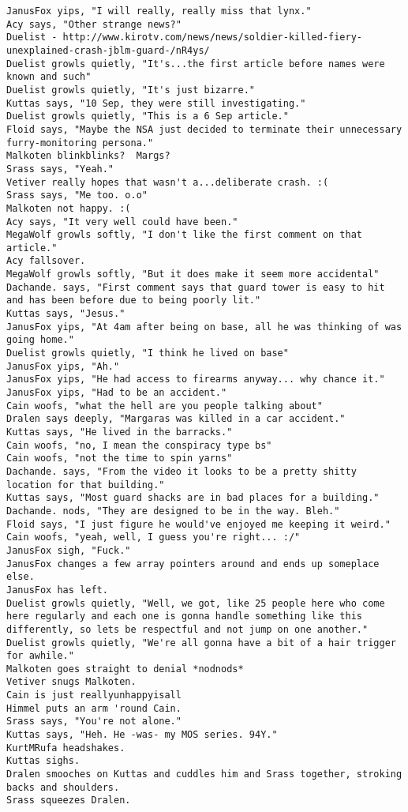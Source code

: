 \begin{verbatim}
JanusFox yips, "I will really, really miss that lynx."
Acy says, "Other strange news?"
Duelist - http://www.kirotv.com/news/news/soldier-killed-fiery-unexplained-crash-jblm-guard-/nR4ys/
Duelist growls quietly, "It's...the first article before names were known and such"
Duelist growls quietly, "It's just bizarre."
Kuttas says, "10 Sep, they were still investigating."
Duelist growls quietly, "This is a 6 Sep article."
Floid says, "Maybe the NSA just decided to terminate their unnecessary furry-monitoring persona."
Malkoten blinkblinks?  Margs?
Srass says, "Yeah."
Vetiver really hopes that wasn't a...deliberate crash. :(
Srass says, "Me too. o.o"
Malkoten not happy. :(
Acy says, "It very well could have been."
MegaWolf growls softly, "I don't like the first comment on that article."
Acy fallsover.
MegaWolf growls softly, "But it does make it seem more accidental"
Dachande. says, "First comment says that guard tower is easy to hit and has been before due to being poorly lit."
Kuttas says, "Jesus."
JanusFox yips, "At 4am after being on base, all he was thinking of was going home."
Duelist growls quietly, "I think he lived on base"
JanusFox yips, "Ah."
JanusFox yips, "He had access to firearms anyway... why chance it."
JanusFox yips, "Had to be an accident."
Cain woofs, "what the hell are you people talking about"
Dralen says deeply, "Margaras was killed in a car accident."
Kuttas says, "He lived in the barracks."
Cain woofs, "no, I mean the conspiracy type bs"
Cain woofs, "not the time to spin yarns"
Dachande. says, "From the video it looks to be a pretty shitty location for that building."
Kuttas says, "Most guard shacks are in bad places for a building."
Dachande. nods, "They are designed to be in the way. Bleh."
Floid says, "I just figure he would've enjoyed me keeping it weird."
Cain woofs, "yeah, well, I guess you're right... :/"
JanusFox sigh, "Fuck."
JanusFox changes a few array pointers around and ends up someplace else.
JanusFox has left.
Duelist growls quietly, "Well, we got, like 25 people here who come here regularly and each one is gonna handle something like this differently, so lets be respectful and not jump on one another."
Duelist growls quietly, "We're all gonna have a bit of a hair trigger for awhile."
Malkoten goes straight to denial *nodnods*
Vetiver snugs Malkoten.
Cain is just reallyunhappyisall
Himmel puts an arm 'round Cain.
Srass says, "You're not alone."
Kuttas says, "Heh. He -was- my MOS series. 94Y."
KurtMRufa headshakes.
Kuttas sighs.
Dralen smooches on Kuttas and cuddles him and Srass together, stroking backs and shoulders.
Srass squeezes Dralen.

\end{verbatim}
